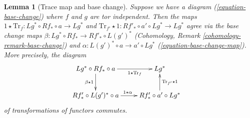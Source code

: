\documentclass{stacks-project}
\theoremstyle{plain}
\newtheorem{lemma}[subsection]{Lemma}
\theoremstyle{definition}
\theoremstyle{remark}
\numberwithin{equation}{subsection}
\begin{document}
\begin{lemma}[Trace map and base change]
\label{lemma-trace-map-and-base-change}
Suppose we have a diagram (\ref{equation-base-change}) where $f$ and $g$
are tor independent. Then the maps
$1 \star \text{Tr}_f : Lg^* \circ Rf_* \circ a \to Lg^*$ and
$\text{Tr}_{f'} \star 1 : Rf'_* \circ a' \circ Lg^* \to Lg^*$
agree via the base change maps
$\beta : Lg^* \circ Rf_* \to Rf'_* \circ L(g')^*$
(Cohomology, Remark \ref{cohomology-remark-base-change})
and $\alpha : L(g')^* \circ a \to a' \circ Lg^*$
(\ref{equation-base-change-map}).
More precisely, the diagram
$$
\xymatrix{
Lg^* \circ Rf_* \circ a
\ar[d]_{\beta \star 1} \ar[r]_-{1 \star \text{Tr}_f} &
Lg^* \\
Rf'_* \circ L(g')^* \circ a \ar[r]^{1 \star \alpha} &
Rf'_* \circ a' \circ Lg^* \ar[u]_{\text{Tr}_{f'} \star 1}
}
$$
of transformations of functors commutes.
\end{lemma}
\end{document}
